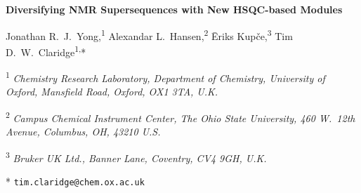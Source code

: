 \documentclass[11pt]{article}
\newcommand*{\hsqctitle}{Diversifying NMR Supersequences with New HSQC-based Modules}
\newcommand*{\carbon}{13C}
\newcommand*{\proton}{1H}
\newcommand*{\nitrogen}{15N}
\begin{document}
\begin{refsection}

\begin{center}
    \Large \textbf{\hsqctitle{}}

    \vspace{0.2cm}

    \large Jonathan R.\ J.\ Yong,\textsuperscript{1} Alexandar L.\ Hansen,\textsuperscript{2} {\=E}riks Kup{\v{c}}e,\textsuperscript{3} Tim D.\ W.\ Claridge\textsuperscript{1,}*

    \vspace{0.2cm}

    \normalsize

    \textsuperscript{1} \textit{Chemistry Research Laboratory, Department of Chemistry, University of Oxford, Mansfield Road, Oxford, OX1 3TA, U.K.}

    \textsuperscript{2} \textit{Campus Chemical Instrument Center, The Ohio State University, 460 W.\ 12th Avenue, Columbus, OH, 43210 U.S.}

    \textsuperscript{3} \textit{Bruker UK Ltd., Banner Lane, Coventry, CV4 9GH, U.K.}

    * \texttt{tim.claridge@chem.ox.ac.uk}
\end{center}
\vspace{0.5cm}
\begin{abstract}
    The sensitivity-enhanced HSQC, as well as HSQC-TOCSY, experiments are incorporated into NOAH (NMR by Ordered Acquisition using \proton{} detection) supersequences, adding diversity for \carbon{} and \nitrogen{} modules.
    Importantly, these heteronuclear modules are specifically tailored to preserve the magnetisation required for subsequent acquisition of homonuclear modules in a supersequence.
    In addition, we present protocols for optimally combining HSQC and HSQC-TOCSY elements within the same supersequences, yielding high-quality 2D spectra suitable for structure characterisation but with greatly reduced experiment durations.
\end{abstract}


\end{refsection}
\end{document}
